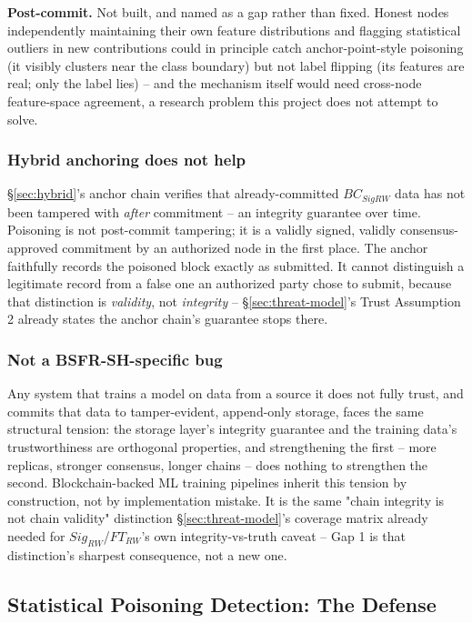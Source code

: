 \documentclass[conference]{IEEEtran}
\begin{document}
\textbf{Post-commit.} Not built, and named as a gap rather than fixed. Honest nodes independently
maintaining their own feature distributions and flagging statistical outliers in new
contributions could in principle catch anchor-point-style poisoning (it visibly clusters near
the class boundary) but not label flipping (its features are real; only the label lies) -- and
the mechanism itself would need cross-node feature-space agreement, a research problem this
project does not attempt to solve.

\subsubsection{Hybrid anchoring does not help}

\S\ref{sec:hybrid}'s anchor chain verifies that already-committed $BC_{SigRW}$ data has not been
tampered with \emph{after} commitment -- an integrity guarantee over time. Poisoning is not
post-commit tampering; it is a validly signed, validly consensus-approved commitment by an
authorized node in the first place. The anchor faithfully records the poisoned block exactly as
submitted. It cannot distinguish a legitimate record from a false one an authorized party chose
to submit, because that distinction is \emph{validity}, not \emph{integrity} --
\S\ref{sec:threat-model}'s Trust Assumption 2 already states the anchor chain's guarantee stops
there.

\subsubsection{Not a BSFR-SH-specific bug}

Any system that trains a model on data from a source it does not fully trust, and commits that
data to tamper-evident, append-only storage, faces the same structural tension: the storage
layer's integrity guarantee and the training data's trustworthiness are orthogonal properties,
and strengthening the first -- more replicas, stronger consensus, longer chains -- does nothing
to strengthen the second. Blockchain-backed ML training pipelines inherit this tension by
construction, not by implementation mistake. It is the same "chain integrity is not chain
validity" distinction \S\ref{sec:threat-model}'s coverage matrix already needed for
$Sig_{RW}$/$FT_{RW}$'s own integrity-vs-truth caveat -- Gap 1 is that distinction's sharpest
consequence, not a new one.

\subsection{Statistical Poisoning Detection: The Defense}
\label{sec:m7-12}
\end{document}
